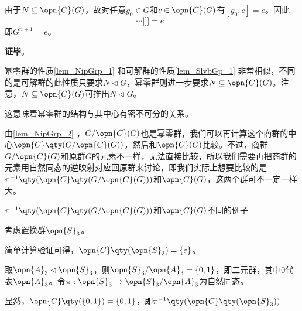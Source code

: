 由于$N\subseteq\opn{C}(G)$，故对任意$g_0\in G$和$c\in\opn{C}(G)$有$[g_0, c]=e$。因此
\begin{equation}
[g_0, [g_1, [g_2\cdots[g_{n-1}, g_n]\cdots]]] =e~. 
\end{equation}
即$G^{n+1}=e$。

\textbf{证毕}。


幂零群的性质\autoref{lem_NipGrp_1} 和可解群的性质\autoref{lem_SlvbGp_1} 非常相似，不同的是可解群的此性质只要求$N\lhd G$，幂零群则进一步要求$N\subseteq \opn{C}(G)$。注意，$N\subseteq \opn{C}(G)$可推出$N\lhd G$。

这意味着幂零群的结构与其中心有密不可分的关系。


由\autoref{lem_NipGrp_2} ，$G/\opn{C}(G)$也是幂零群，我们可以再计算这个商群的中心$\opn{C}\qty(G/\opn{C}(G))$，然后和$\opn{C}(G)$比较。不过，商群$G/\opn{C}(G)$和原群$G$的元素不一样，无法直接比较，所以我们需要再把商群的元素用自然同态的逆映射对应回原群来讨论，即我们实际上想要比较的是$\pi^{-1}\qty(\opn{C}\qty(G/\opn{C}(G)))$和$\opn{C}(G)$，这两个群可不一定一样大。



\begin{example}{$\pi^{-1}\qty(\opn{C}\qty(G/\opn{C}(G)))$和$\opn{C}(G)$不同的例子}

考虑置换群$\opn{S}_3$。

简单计算验证可得，$\opn{C}\qty(\opn{S}_3)=\{e\}$。

取$\opn{A}_3\lhd \opn{S}_3$，则$\opn{S}_3/\opn{A}_3=\{0, 1\}$，即二元群，其中$0$代表$\opn{A}_3$。令$\pi:\opn{S}_3\to \opn{S}_3/\opn{A}_3$为自然同态。

显然，$\opn{C}\qty(\{0, 1\})=\{0, 1\}$，即$\pi^{-1}\qty(\opn{C}\qty(\opn{S}_3))$

\end{example}
























